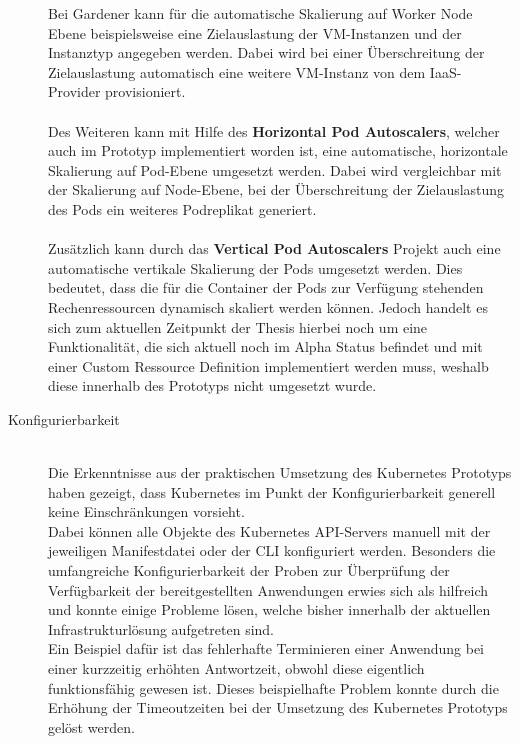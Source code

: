 \begin{description}
Bei Gardener kann für die automatische Skalierung auf Worker Node Ebene beispielsweise eine Zielauslastung der \ac{VM}-Instanzen und der Instanztyp angegeben werden. Dabei wird bei einer Überschreitung der Zielauslastung automatisch eine weitere \ac{VM}-Instanz von dem \ac{IaaS}-Provider provisioniert.\autocite[Vgl][]{KubernetesAuthors.20191126}\\
\\
Des Weiteren kann mit Hilfe des \textbf{Horizontal Pod Autoscalers}, welcher auch im Prototyp implementiert worden ist, eine automatische, horizontale Skalierung auf Pod-Ebene umgesetzt werden. Dabei wird vergleichbar mit der Skalierung auf Node-Ebene, bei der Überschreitung der Zielauslastung des Pods ein weiteres Podreplikat generiert.\\
\\
Zusätzlich kann durch das \textbf{Vertical Pod Autoscalers} Projekt auch eine automatische vertikale Skalierung der Pods umgesetzt werden. Dies bedeutet, dass die für die Container der Pods zur Verfügung stehenden Rechenressourcen dynamisch skaliert werden können. Jedoch handelt es sich zum aktuellen Zeitpunkt der Thesis hierbei noch um eine Funktionalität, die sich aktuell noch im Alpha Status befindet und mit einer Custom Ressource Definition implementiert werden muss, weshalb diese innerhalb des Prototyps nicht umgesetzt wurde.\autocite[Vgl][]{GitHubRepositoryKubernetes.20191127}%
\\
\item[Konfigurierbarkeit] \hfill \\
Die Erkenntnisse aus der praktischen Umsetzung des Kubernetes Prototyps haben gezeigt, dass Kubernetes im Punkt der Konfigurierbarkeit generell keine Einschränkungen vorsieht.\\
Dabei können alle Objekte des Kubernetes \ac{API}-Servers manuell mit der jeweiligen Manifestdatei oder der \ac{CLI} konfiguriert werden. Besonders die umfangreiche Konfigurierbarkeit der Proben zur Überprüfung der Verfügbarkeit der bereitgestellten Anwendungen erwies sich als hilfreich und konnte einige Probleme lösen, welche bisher innerhalb der aktuellen Infrastrukturlösung aufgetreten sind.\\ Ein Beispiel dafür ist das fehlerhafte Terminieren einer Anwendung bei einer kurzzeitig erhöhten Antwortzeit, obwohl diese eigentlich funktionsfähig gewesen ist. Dieses beispielhafte Problem konnte durch die Erhöhung der Timeoutzeiten bei der Umsetzung des Kubernetes Prototyps gelöst werden.\\

\end{description}
